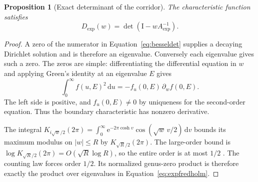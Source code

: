 \documentclass[11pt,letterpaper]{article}
\numberwithin{equation}{section}
\newtheorem{proposition}[theorem]{Proposition}
\theoremstyle{definition}
\theoremstyle{remark}
\newcommand{\Id}{\mathrm I}
\newcommand{\dd}{\,\mathrm d}
\newcommand{\e}{\mathrm e}
\begin{document}
\begin{proposition}[Exact determinant of the corridor]
\label{prop:expdet}
The characteristic function satisfies
\begin{equation}
 D_{\mathrm{exp}}(w)=\det(\Id-wA_{\mathrm{exp}}^{-1}).
 \label{eq:expfredholm}
\end{equation}
\end{proposition}
\begin{proof}
A zero of the numerator in Equation~\eqref{eq:besseldet} supplies a decaying Dirichlet solution and is therefore an eigenvalue. Conversely each eigenvalue gives such a zero. The zeros are simple: differentiating the differential equation in $w$ and applying Green's identity at an eigenvalue $E$ gives
\[
 \int_0^\infty f(u,E)^2\dd u
 =-f_u(0,E)\,\partial_w f(0,E).
\]
The left side is positive, and $f_u(0,E)\neq0$ by uniqueness for the second-order equation. Thus the boundary characteristic has nonzero derivative.

The integral $K_{i\sqrt w/2}(2\pi)=\int_0^\infty\e^{-2\pi\cosh v}\cos(\sqrt w\,v/2)\dd v$ bounds its maximum modulus on $|w|\leq R$ by $K_{\sqrt R/2}(2\pi)$. The large-order bound is $\log K_{\sqrt R/2}(2\pi)=O(\sqrt R\log R)$, so the entire order is at most $1/2$ \cite{dlmf}. The counting law forces order $1/2$. Its normalized genus-zero product is therefore exactly the product over eigenvalues in Equation~\eqref{eq:expfredholm}.
\end{proof}
\end{document}
